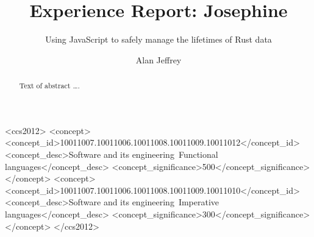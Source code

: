\documentclass[acmsmall]{acmart}
\begin{document}
\title[Josephine]{Experience Report: Josephine}
\subtitle{Using JavaScript to safely manage the lifetimes of Rust data}

\author{Alan Jeffrey}

\begin{abstract}
Text of abstract \ldots.
\end{abstract}

\begin{CCSXML}
<ccs2012>
<concept>
<concept_id>10011007.10011006.10011008.10011009.10011012</concept_id>
<concept_desc>Software and its engineering~Functional languages</concept_desc>
<concept_significance>500</concept_significance>
</concept>
<concept>
<concept_id>10011007.10011006.10011008.10011009.10011010</concept_id>
<concept_desc>Software and its engineering~Imperative languages</concept_desc>
<concept_significance>300</concept_significance>
</concept>
</ccs2012>
\end{CCSXML}



\maketitle




\end{document}
